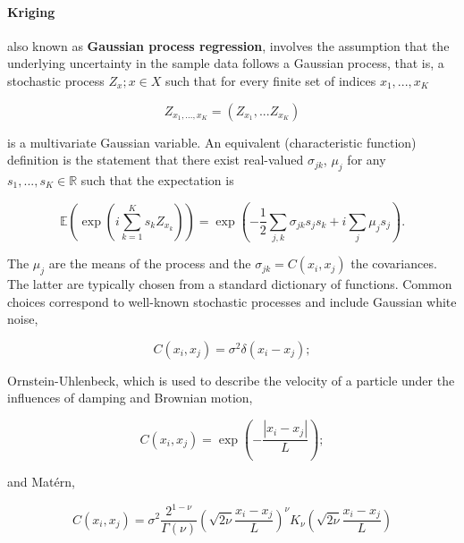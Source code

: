 \paragraph{Kriging} also known as \textbf{Gaussian process regression}, involves the assumption that the underlying uncertainty 
in the sample data follows a Gaussian process, that is, a stochastic process ${Z_x; x \in X}$ such 
that for every finite set of indices $x_1, ... , x_K$

\begin{equation}
Z_{x_1, ... , x_K} = \left ( Z_{x_1}, ... Z_{x_K} \right )
\end{equation}

is a multivariate Gaussian variable.  An equivalent (characteristic function) definition is the
statement that there exist 
real-valued $\sigma_{jk}$, $\mu_j$ for any $s_1, ... , s_K \in \mathbb{R}$ such that the 
expectation is

\begin{equation}
\mathbb{E} \left ( \exp \left ( i \sum_{k=1}^K {s_k Z_{x_k} }\right ) \right ) = \exp \left ( 
-\frac{1}{2} \sum_{j,k} \sigma_{jk} s_j s_k + i \sum_{j}{\mu_j s_j } \right ).
\end{equation}

The $\mu_j$ are the means of the process and the $\sigma_{jk}=C(x_i, x_j)$ the covariances.  
The latter are typically chosen from a standard dictionary of functions.
Common choices correspond to 
well-known stochastic processes and include Gaussian white noise,

\begin{equation}\label{eq:stoch}
C(x_i, x_j) = \sigma^2 \delta(x_i-x_j);
\end{equation}

Ornstein-Uhlenbeck, which is used to describe the velocity of a particle under the influences of 
damping and Brownian motion,

\begin{equation}\label{eq:OU}
C(x_i, x_j) = \exp \left ( -\frac{|x_i-x_j|}{L}\right );
\end{equation}

and Mat\'ern, 

\begin{equation}\label{eq:matern}
C(x_i, x_j) = \sigma^2 \frac{2^{1-\nu}}{\Gamma(\nu)} \left ( \sqrt{2 \nu} \frac{x_i-x_j}{L} \right 
)^{\nu} K_{\nu} \left ( \sqrt{2 \nu} \frac{x_i-x_j}{L} \right)
\end{equation}

